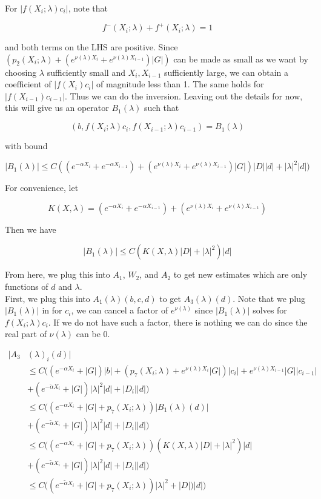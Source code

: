 \documentclass[12pt]{article}
\begin{document}
\begin{enumerate}
For $|f(X_i; \lambda) c_i|$, note that 

\[
f^-(X_i; \lambda) + f^+(X_i; \lambda) = 1
\]

and both terms on the LHS are positive. Since $(p_2(X_i; \lambda) + (e^{\nu(\lambda)X_i} + e^{\nu(\lambda)X_{i-1}})|G|)$ can be made as small as we want by choosing $\lambda$ sufficiently small and $X_i, X_{i-1}$ sufficiently large, we can obtain a coefficient of $|f(X_i)c_i|$ of magnitude less than 1. The same holds for $|f(X_{i-1})c_{i-1}|$. Thus we can do the inversion. Leaving out the details for now, this will give us an operator $B_1(\lambda)$ such that

\[
(b, f(X_i; \lambda) c_i, f(X_{i-1}; \lambda) c_{i-1} ) = B_1(\lambda)
\]

with bound

\[
|B_1(\lambda)| \leq C( (e^{-\alpha X_i} + e^{-\alpha X_{i-1}}) + (e^{\nu(\lambda)X_i} + e^{\nu(\lambda)X_{i-1}}) |G|) |D||d| + |\lambda|^2 |d|)
\]

For convenience, let

\[
K(X, \lambda) = (e^{-\alpha X_i} + e^{-\alpha X_{i-1}}) + (e^{\nu(\lambda)X_i} + e^{\nu(\lambda)X_{i-1}})
\]

Then we have

\[
|B_1(\lambda)| \leq C( K(X, \lambda) |D|+ |\lambda|^2 )|d|
\]


From here, we plug this into $A_1$, $W_2$, and $A_2$ to get new estimates which are only functions of $d$ and $\lambda$.\\

First, we plug this into $A_1(\lambda)(b, c, d)$ to get $A_3(\lambda)(d)$. Note that we plug $|B_1(\lambda)|$ in for $c_i$, we can cancel a factor of $e^{\nu(\lambda)}$ since $|B_1(\lambda)|$ solves for $f(X_i; \lambda) c_i$. If we do not have such a factor, there is nothing we can do since the real part of $\nu(\lambda)$ can be 0.

\begin{align*}
|A_3&(\lambda)_i(d)| \\
&\leq C \Big( (e^{-\alpha X_i} + |G|) |b|
+ ( p_7(X_i; \lambda) + e^{\nu(\lambda)X_i} |G|) |c_i| + e^{\nu(\lambda)X_{i-1}} |G| |c_{i-1}| \\
&+ (e^{-\tilde{\alpha} X_i} + |G|) |\lambda|^2 |d| + |D_i||d| \Big) \\
&\leq C \Big( (e^{-\alpha X_i} + |G| + p_7(X_i; \lambda) )|B_1(\lambda)(d)|\\
&+ (e^{-\tilde{\alpha} X_i} + |G|) |\lambda|^2 |d| + |D_i||d| \Big) \\
&\leq C \Big( (e^{-\alpha X_i} + |G| + p_7(X_i; \lambda) )( K(X, \lambda) |D|+ |\lambda|^2 )|d|\\
&+ (e^{-\tilde{\alpha} X_i} + |G|) |\lambda|^2 |d| + |D_i||d| \Big) \\
&\leq C \Big( (e^{-\tilde{\alpha} X_i} + |G| + p_7(X_i; \lambda) ) |\lambda|^2  + |D|)|d| \Big) \\
\end{align*}


\end{enumerate}
\end{document}
